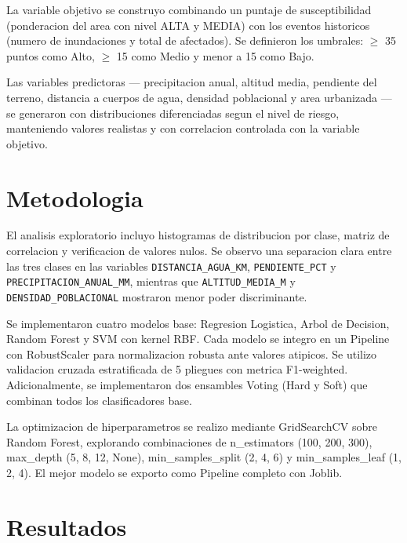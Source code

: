 \documentclass[12pt,a4paper]{article}
\begin{document}
La variable objetivo se construyo combinando un puntaje de susceptibilidad (ponderacion del area con nivel ALTA y MEDIA) con los eventos historicos (numero de inundaciones y total de afectados). Se definieron los umbrales: $\geq$ 35 puntos como Alto, $\geq$ 15 como Medio y menor a 15 como Bajo.

Las variables predictoras --- precipitacion anual, altitud media, pendiente del terreno, distancia a cuerpos de agua, densidad poblacional y area urbanizada --- se generaron con distribuciones diferenciadas segun el nivel de riesgo, manteniendo valores realistas y con correlacion controlada con la variable objetivo.

\section{Metodologia}

El analisis exploratorio incluyo histogramas de distribucion por clase, matriz de correlacion y verificacion de valores nulos. Se observo una separacion clara entre las tres clases en las variables \texttt{DISTANCIA\_AGUA\_KM}, \texttt{PENDIENTE\_PCT} y \texttt{PRECIPITACION\_ANUAL\_MM}, mientras que \texttt{ALTITUD\_MEDIA\_M} y \texttt{DENSIDAD\_POBLACIONAL} mostraron menor poder discriminante.

Se implementaron cuatro modelos base: Regresion Logistica, Arbol de Decision, Random Forest y SVM con kernel RBF. Cada modelo se integro en un Pipeline con RobustScaler para normalizacion robusta ante valores atipicos. Se utilizo validacion cruzada estratificada de 5 pliegues con metrica F1-weighted. Adicionalmente, se implementaron dos ensambles Voting (Hard y Soft) que combinan todos los clasificadores base.

La optimizacion de hiperparametros se realizo mediante GridSearchCV sobre Random Forest, explorando combinaciones de n\_estimators (100, 200, 300), max\_depth (5, 8, 12, None), min\_samples\_split (2, 4, 6) y min\_samples\_leaf (1, 2, 4). El mejor modelo se exporto como Pipeline completo con Joblib.

\section{Resultados}
\end{document}
